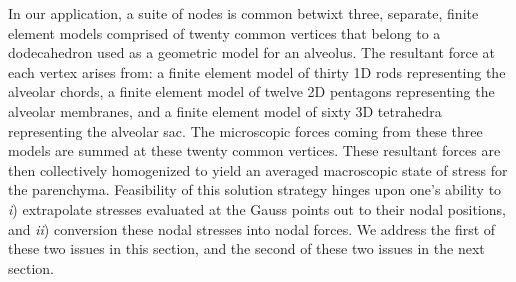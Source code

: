 In our application, a suite of nodes is common betwixt three, separate, finite element models comprised of twenty common vertices that belong to a dodecahedron used as a geometric model for an alveolus.  The resultant force at each vertex arises from: a finite element model of thirty 1D rods representing the alveolar chords, a finite element model of twelve 2D pentagons representing the alveolar membranes, and a finite element model of sixty 3D tetrahedra representing the alveolar sac.  The micro\-scopic forces coming from these three models are summed at these twenty common vertices. These resultant forces are then collectively homogenized to yield an averaged macroscopic state of stress for the parenchyma.  Feasibility of this solution strategy hinges upon one's ability to \textit{i\/}) extrapolate stresses evaluated at the Gauss points out to their nodal positions, and \textit{ii\/}) conversion these nodal stresses into nodal forces.  We address the first of these two issues in this section, and the second of these two issues in the next section.

